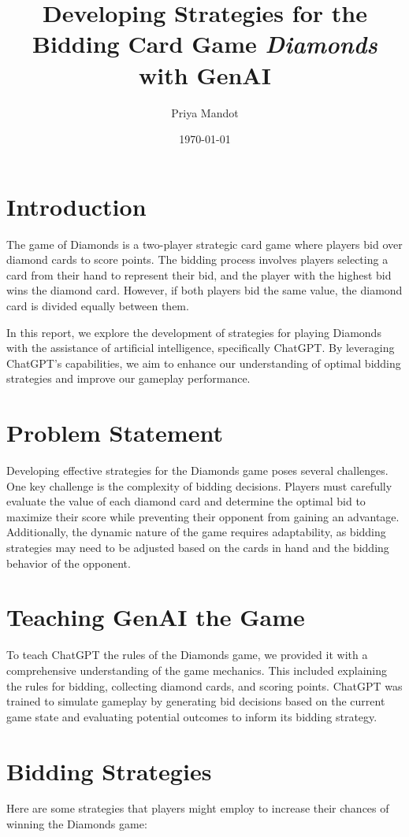 \documentclass{article}
\title{Developing Strategies for the Bidding Card Game \textit{Diamonds} with GenAI}
\author{Priya Mandot}
\date{\today}
\begin{document}
\maketitle

\section{Introduction}
The game of Diamonds is a two-player strategic card game where players bid over diamond cards to score points. The bidding process involves players selecting a card from their hand to represent their bid, and the player with the highest bid wins the diamond card. However, if both players bid the same value, the diamond card is divided equally between them.

In this report, we explore the development of strategies for playing Diamonds with the assistance of artificial intelligence, specifically ChatGPT. By leveraging ChatGPT's capabilities, we aim to enhance our understanding of optimal bidding strategies and improve our gameplay performance.

\section{Problem Statement}
Developing effective strategies for the Diamonds game poses several challenges. One key challenge is the complexity of bidding decisions. Players must carefully evaluate the value of each diamond card and determine the optimal bid to maximize their score while preventing their opponent from gaining an advantage. Additionally, the dynamic nature of the game requires adaptability, as bidding strategies may need to be adjusted based on the cards in hand and the bidding behavior of the opponent.

\section{Teaching GenAI the Game}
To teach ChatGPT the rules of the Diamonds game, we provided it with a comprehensive understanding of the game mechanics. This included explaining the rules for bidding, collecting diamond cards, and scoring points. ChatGPT was trained to simulate gameplay by generating bid decisions based on the current game state and evaluating potential outcomes to inform its bidding strategy.

\section{Bidding Strategies}
Here are some strategies that players might employ to increase their chances of winning the Diamonds game:
\end{document}
